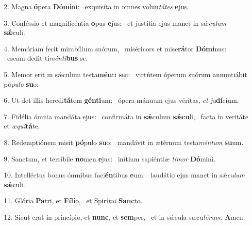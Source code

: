 2. Magna \textbf{ó}pera \textbf{Dó}\textbf{mi}ni: \ast\  exquisíta in omnes volun\textit{tá}\textit{tes} \textbf{e}jus.\

3. Conféssio et magnificéntia \textbf{o}pus \textbf{e}jus: \ast\  et justítia ejus manet in sǽ\textit{cu}\textit{lum} \textbf{sǽ}culi.\

4. Memóriam fecit mirabílium suórum, \dag\  miséricors et mise\textbf{rá}tor \textbf{Dó}\textbf{mi}nus: \ast\  escam dedit ti\textit{mén}\textit{ti}\textbf{bus} se.\

5. Memor erit in sǽculum testa\textbf{mén}ti \textbf{su}i: \ast\  virtútem óperum suórum annuntiábit pó\textit{pu}\textit{lo} \textbf{su}o:\

6. Ut det illis heredi\textbf{tá}tem \textbf{gén}\textbf{ti}um: \ast\  ópera mánuum ejus véritas, \textit{et} \textit{ju}\textbf{dí}cium.\

7. Fidélia ómnia mandáta ejus: \dag\  confirmáta in \textbf{sǽ}culum \textbf{sǽ}\textbf{cu}li, \ast\  facta in veritáte et \textit{æ}\textit{qui}\textbf{tá}te.\

8. Redemptiónem misit \textbf{pó}pulo \textbf{su}o: \ast\  mandávit in ætérnum testa\textit{mén}\textit{tum} \textbf{su}um.\

9. Sanctum, et terríbile \textbf{no}men \textbf{e}jus: \ast\  inítium sapiéntiæ \textit{ti}\textit{mor} \textbf{Dó}mini.\

10. Intelléctus bonus ómnibus faci\textbf{én}tibus \textbf{e}um: \ast\  laudátio ejus manet in sǽ\textit{cu}\textit{lum} \textbf{sǽ}culi.\

11. Glória \textbf{Pa}tri, et \textbf{Fí}\textbf{li}o, \ast\  et Spirí\textit{tu}\textit{i} \textbf{Sanc}to.\

12. Sicut erat in princípio, et \textbf{nunc}, et \textbf{sem}per, \ast\  et in sǽcula sæcu\textit{ló}\textit{rum}. \textbf{A}men.\

